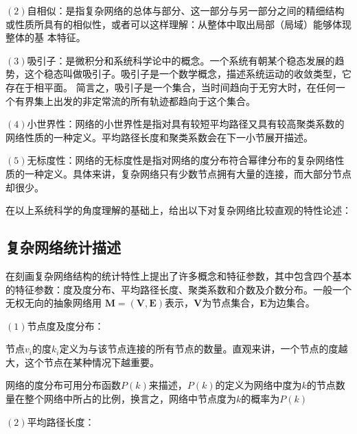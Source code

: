 $(2)$自相似：是指复杂网络的总体与部分、这一部分与另一部分之间的精细结构或性质所具有的相似性，或者可以这样理解：从整体中取出局部（局域）能够体现整体的基
本特征。

$(3)$吸引子：是微积分和系统科学论中的概念。一个系统有朝某个稳态发展的趋势，这个稳态叫做吸引子。吸引子是一个数学概念，描述系统运动的收敛类型，它存在于相平面。
简言之，吸引子是一个集合，当时间趋向于无穷大时，在任何一个有界集上出发的非定常流的所有轨迹都趋向于这个集合。

$(4)$小世界性：网络的小世界性是指对具有较短平均路径又具有较高聚类系数的网络性质的一种定义。平均路径长度和聚类系数会在下一小节展开描述。

$(5)$无标度性：网络的无标度性是指对网络的度分布符合幂律分布的复杂网络性质的一种定义。具体来讲，复杂网络只有少数节点拥有大量的连接，而大部分节点却很少。

在以上系统科学的角度理解的基础上，给出以下对复杂网络比较直观的特性论述：








\subsection{复杂网络统计描述}
\label{sec:feature}
在刻画复杂网络结构的统计特性上提出了许多概念和特征参数，其中包含四个基本的特征参数：度及度分布、平均路径长度、聚类系数和介数及介数分布。一般一个无权无向的抽象网络用
$\boldsymbol{M}=(\boldsymbol{V}, \boldsymbol{E})$表示，$\boldsymbol{V}$为节点集合，$\boldsymbol{E}$为边集合。

$(1)$节点度及度分布：

节点$v_i$的度$k_i$定义为与该节点连接的所有节点的数量。直观来讲，一个节点的度越大，这个节点在某种情况下越重要。

网络的度分布可用分布函数$P(k)$来描述，$P(k)$的定义为网络中度为$k$的节点数量在整个网络中所占的比例，换言之，网络中节点度为$k$的概率为$P(k)$

$(2)$平均路径长度：

